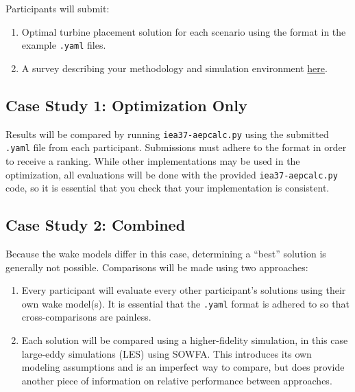 \documentclass{article}
\begin{document}
    Participants will submit:
    \begin{enumerate}
        \item Optimal turbine placement solution for each scenario using the format in the example \texttt{.yaml} files. 
        \item A survey describing your methodology and simulation environment \href{https://goo.gl/forms/2tX3eJ0rlnElmTgR2}{here}.
    \end{enumerate}

    \subsection{Case Study 1: Optimization Only}

        Results will be compared by running \texttt{iea37-aepcalc.py} using the submitted \texttt{.yaml} file from each participant.  Submissions must adhere to the format in order to receive a ranking.  While other implementations may be used in the optimization, all evaluations will be done with the provided \texttt{iea37-aepcalc.py} code, so it is essential that you check that your implementation is consistent.

    \subsection{Case Study 2: Combined}

        Because the wake models differ in this case, determining a ``best'' solution is generally not possible.  Comparisons will be made using two approaches:
        \begin{enumerate}
            \item Every participant will evaluate every other participant's solutions using their own wake model(s).  It is essential that the \texttt{.yaml} format is adhered to so that cross-comparisons are painless. %
            \item Each solution will be compared using a higher-fidelity simulation, in this case large-eddy simulations (LES) using SOWFA.  This introduces its own modeling assumptions and is an imperfect way to compare, but does provide another piece of information on relative performance between approaches. %
        \end{enumerate}
\end{document}
